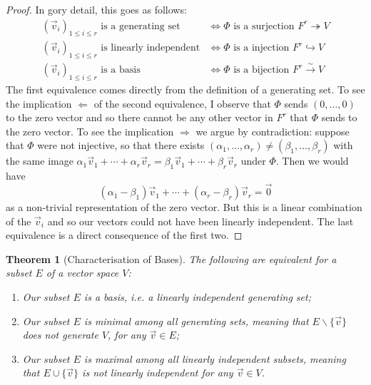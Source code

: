 \documentclass[11pt]{amsbook}
\newtheorem{theorem}{Theorem}[section]
\theoremstyle{definition}
\begin{document}
\begin{proof}
In gory detail, this goes as follows:
\begin{align*}
(\vec{v}_i)_{1\leqslant i \leqslant r} \text{ is a generating set} & \Leftrightarrow   \Phi \text{ is a surjection }  F^r \twoheadrightarrow V \\
(\vec{v}_i)_{1\leqslant i \leqslant r} \text{ is linearly independent} & \Leftrightarrow   \Phi \text{ is a injection }  F^r \hookrightarrow V \\
(\vec{v}_i)_{1\leqslant i \leqslant r} \text{ is a basis} & \Leftrightarrow   \Phi \text{ is a bijection }  F^r\stackrel{\sim}{\to} V
\end{align*}
The first equivalence comes directly from the definition of a generating set. To see the implication $\Leftarrow$ of the second equivalence, I observe that $\Phi$ sends $(0, \ldots , 0)$ to the zero vector and so there cannot be any other vector in $F^r$ that $\Phi$ sends to the zero vector. To see the implication $\Rightarrow$ we argue by contradiction: suppose that $\Phi$ were not injective, so that there exists $(\alpha_1, \ldots , \alpha_r)\neq (\beta_1, \ldots , \beta_r)$ with the same image $\alpha_1 \vec{v}_1 + \cdots + \alpha_r \vec{v}_r = \beta_1 \vec{v}_1 + \cdots + \beta_r \vec{v}_r$ under $\Phi$. Then we would have $$(\alpha_1-\beta_1) \vec{v}_1 + \cdots + (\alpha_r -\beta_r) \vec{v}_r = \vec{0}$$ as a non-trivial representation of the zero vector. But this is a linear combination of the $\vec{v}_i$ and so our vectors could not have been linearly independent. The last equivalence is a direct consequence of the first two.
\end{proof}

\begin{theorem}[Characterisation of Bases] \label{charbasis}
The following are equivalent for a subset $E$ of a vector space $V$:
\begin{enumerate}
\item Our subset $E$ is a basis, i.e. a linearly independent generating set;
\item Our subset $E$ is minimal among all generating sets, meaning that
$E \backslash \{\vec{v}\}$ does not generate $V$, for any $\vec{v} \in E$;
\item Our subset $E$ is maximal among all linearly independent subsets, meaning
that $E \cup \{\vec{v}\}$ is not linearly independent for any $\vec{v} \in V$.
\end{enumerate}
\end{theorem}
\end{document}
